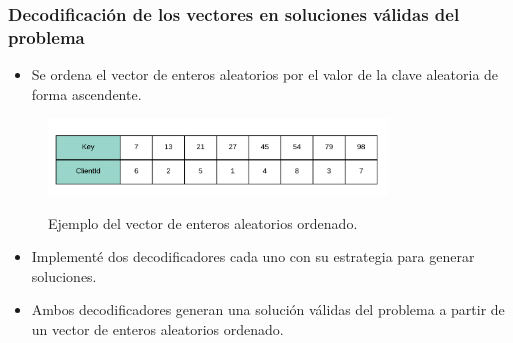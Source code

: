 \documentclass{beamer}
\begin{document}
\begin{frame}
\frametitle{Decodificación de los vectores en soluciones válidas del problema}

\begin{itemize}
    \item Se ordena el vector de enteros aleatorios por el valor de la clave aleatoria de forma ascendente.
    \pause
\end{itemize}

\begin{figure}[h]
	\caption{Ejemplo del vector de enteros aleatorios ordenado.}
	\centering
	\includegraphics[width=9cm]{RandomKeysOrdenado}
	\label{fig:RandomKeysOrdenado}
\end{figure}

\begin{itemize}
    \pause
    \item Implementé dos decodificadores cada uno con su estrategia para generar soluciones.
    \pause
    \item Ambos decodificadores generan una solución válidas del problema a partir de un vector de enteros aleatorios ordenado.
\end{itemize}

\end{frame}

\end{document}
